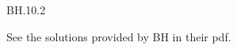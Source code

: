 

\setcounter{theorem}{1}
\begin{exercise} BH.10.2
\begin{solution}
See the solutions provided by BH in their pdf.

\end{solution}
\end{exercise}



